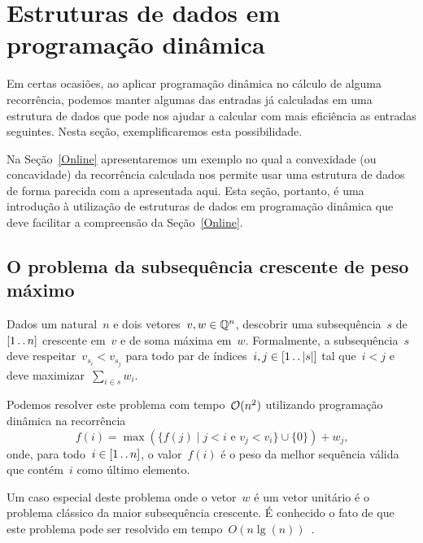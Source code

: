 \chapter{Estruturas de dados em programação dinâmica}
\label{EDPD}

Em certas ocasiões, ao aplicar programação dinâmica no cálculo de alguma recorrência, podemos manter algumas das entradas já calculadas em uma estrutura de dados que pode nos ajudar a calcular com mais eficiência as entradas seguintes. Nesta seção, exemplificaremos esta possibilidade. 

Na Seção~\ref{Online} apresentaremos um exemplo no qual a convexidade (ou concavidade) da recorrência calculada nos permite usar uma estrutura de dados de forma parecida com a apresentada aqui. Esta seção, portanto, é uma introdução à utilização de estruturas de dados em programação dinâmica que deve facilitar a compreensão da Seção~\ref{Online}.


\section{O problema da subsequência crescente de peso máximo}

\begin{prob} \label{EDPD:HIS}
Dados um natural~$n$ e dois vetores~${ v,w \in \mathbb{Q}^n }$, descobrir uma subsequência~$s$ de~$[1 \,.\,.\, n]$ crescente em~$v$ e de soma máxima em~$w$. Formalmente, a subsequência~$s$ deve respeitar~${ v_{s_i} < v_{s_j} }$ para todo par de índices~${ i,j \in [1 \,.\,.\, |s|] }$ tal que~${ i < j }$ e deve maximizar~${ \sum\limits_{i \in s} w_i }$.
\end{prob}

Podemos resolver este problema com tempo~$\mathcal{O}(n^2)$ utilizando programação dinâmica na recorrência
\begin{equation} \label{EDPD:HIS:rec}
f(i) = \max(\{f(j) \mid j < i \text{ e } v_j < v_i\} \cup \{0\}) + w_j \text{,}
\end{equation}
onde, para todo~$i \in [1 \,.\,.\, n]$, o valor~$f(i)$ é o peso da melhor sequência válida que contém~$i$ como último elemento.

Um caso especial deste problema onde o vetor~$w$ é um vetor unitário é o problema clássico da maior subsequência crescente. É conhecido o fato de que este problema pode ser resolvido em tempo~$O(n\lg(n))$~\cite{Fredman:1975}. 

